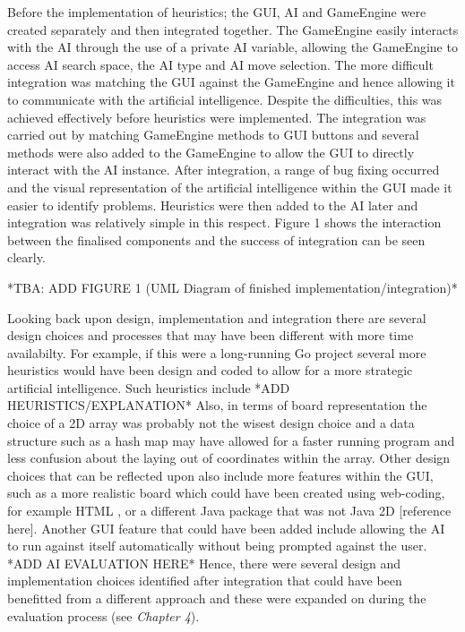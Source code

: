 \documentclass{l3proj}
\begin{document}
Before the implementation of heuristics; the GUI, AI and GameEngine were created separately and then integrated together. The GameEngine easily interacts with the AI through the use of a private AI variable, allowing the GameEngine to access AI search space, the AI type and AI move selection. The more difficult integration was matching the GUI against the GameEngine and hence allowing it to communicate with the artificial intelligence. Despite the difficulties, this was achieved effectively before heuristics were implemented. The integration was carried out by matching GameEngine methods to GUI buttons and several methods were also added to the GameEngine to allow the GUI to directly interact with the AI instance. After integration, a range of bug fixing occurred and the visual representation of the artificial intelligence within the GUI made it easier to identify problems. Heuristics were then added to the AI later and integration was relatively simple in this respect. Figure 1 shows the interaction between the finalised components and the success of integration can be seen clearly.

*TBA: ADD FIGURE 1 (UML Diagram of finished implementation/integration)*

Looking back upon design, implementation and integration there are several design choices and processes that may have been different with more time availabilty. For example, if this were a long-running Go project several more heuristics would have been design and coded to allow for a more strategic artificial intelligence. Such heuristics include *ADD HEURISTICS/EXPLANATION* Also, in terms of board representation the choice of a 2D array was probably not the wisest design choice and a data structure such as a hash map may have allowed for a faster running program and less confusion about the laying out of coordinates within the array. Other design choices that can be reflected upon also include more features within the GUI, such as a more realistic board which could have been created using web-coding, for example HTML \cite{HTMLRef}, or a different Java package that was not Java 2D [reference here]. Another GUI feature that could have been added include allowing the AI to run against itself automatically without being prompted against the user. *ADD AI EVALUATION HERE* Hence, there were several design and implementation choices identified after integration that could have been benefitted from a different approach and these were expanded on during the evaluation process (see \textit{Chapter 4}).
\end{document}
